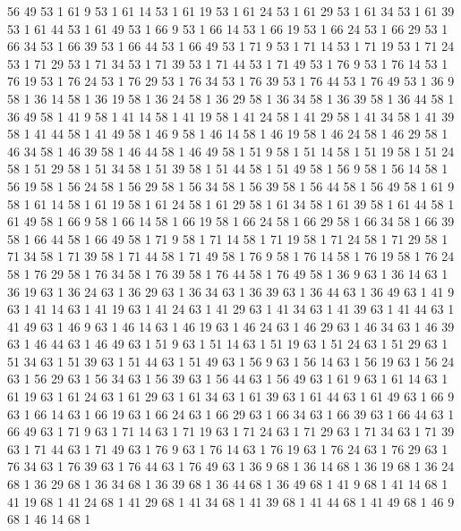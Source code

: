 	56	49	53	1
	61	9	53	1
	61	14	53	1
	61	19	53	1
	61	24	53	1
	61	29	53	1
	61	34	53	1
	61	39	53	1
	61	44	53	1
	61	49	53	1
	66	9	53	1
	66	14	53	1
	66	19	53	1
	66	24	53	1
	66	29	53	1
	66	34	53	1
	66	39	53	1
	66	44	53	1
	66	49	53	1
	71	9	53	1
	71	14	53	1
	71	19	53	1
	71	24	53	1
	71	29	53	1
	71	34	53	1
	71	39	53	1
	71	44	53	1
	71	49	53	1
	76	9	53	1
	76	14	53	1
	76	19	53	1
	76	24	53	1
	76	29	53	1
	76	34	53	1
	76	39	53	1
	76	44	53	1
	76	49	53	1
	36	9	58	1
	36	14	58	1
	36	19	58	1
	36	24	58	1
	36	29	58	1
	36	34	58	1
	36	39	58	1
	36	44	58	1
	36	49	58	1
	41	9	58	1
	41	14	58	1
	41	19	58	1
	41	24	58	1
	41	29	58	1
	41	34	58	1
	41	39	58	1
	41	44	58	1
	41	49	58	1
	46	9	58	1
	46	14	58	1
	46	19	58	1
	46	24	58	1
	46	29	58	1
	46	34	58	1
	46	39	58	1
	46	44	58	1
	46	49	58	1
	51	9	58	1
	51	14	58	1
	51	19	58	1
	51	24	58	1
	51	29	58	1
	51	34	58	1
	51	39	58	1
	51	44	58	1
	51	49	58	1
	56	9	58	1
	56	14	58	1
	56	19	58	1
	56	24	58	1
	56	29	58	1
	56	34	58	1
	56	39	58	1
	56	44	58	1
	56	49	58	1
	61	9	58	1
	61	14	58	1
	61	19	58	1
	61	24	58	1
	61	29	58	1
	61	34	58	1
	61	39	58	1
	61	44	58	1
	61	49	58	1
	66	9	58	1
	66	14	58	1
	66	19	58	1
	66	24	58	1
	66	29	58	1
	66	34	58	1
	66	39	58	1
	66	44	58	1
	66	49	58	1
	71	9	58	1
	71	14	58	1
	71	19	58	1
	71	24	58	1
	71	29	58	1
	71	34	58	1
	71	39	58	1
	71	44	58	1
	71	49	58	1
	76	9	58	1
	76	14	58	1
	76	19	58	1
	76	24	58	1
	76	29	58	1
	76	34	58	1
	76	39	58	1
	76	44	58	1
	76	49	58	1
	36	9	63	1
	36	14	63	1
	36	19	63	1
	36	24	63	1
	36	29	63	1
	36	34	63	1
	36	39	63	1
	36	44	63	1
	36	49	63	1
	41	9	63	1
	41	14	63	1
	41	19	63	1
	41	24	63	1
	41	29	63	1
	41	34	63	1
	41	39	63	1
	41	44	63	1
	41	49	63	1
	46	9	63	1
	46	14	63	1
	46	19	63	1
	46	24	63	1
	46	29	63	1
	46	34	63	1
	46	39	63	1
	46	44	63	1
	46	49	63	1
	51	9	63	1
	51	14	63	1
	51	19	63	1
	51	24	63	1
	51	29	63	1
	51	34	63	1
	51	39	63	1
	51	44	63	1
	51	49	63	1
	56	9	63	1
	56	14	63	1
	56	19	63	1
	56	24	63	1
	56	29	63	1
	56	34	63	1
	56	39	63	1
	56	44	63	1
	56	49	63	1
	61	9	63	1
	61	14	63	1
	61	19	63	1
	61	24	63	1
	61	29	63	1
	61	34	63	1
	61	39	63	1
	61	44	63	1
	61	49	63	1
	66	9	63	1
	66	14	63	1
	66	19	63	1
	66	24	63	1
	66	29	63	1
	66	34	63	1
	66	39	63	1
	66	44	63	1
	66	49	63	1
	71	9	63	1
	71	14	63	1
	71	19	63	1
	71	24	63	1
	71	29	63	1
	71	34	63	1
	71	39	63	1
	71	44	63	1
	71	49	63	1
	76	9	63	1
	76	14	63	1
	76	19	63	1
	76	24	63	1
	76	29	63	1
	76	34	63	1
	76	39	63	1
	76	44	63	1
	76	49	63	1
	36	9	68	1
	36	14	68	1
	36	19	68	1
	36	24	68	1
	36	29	68	1
	36	34	68	1
	36	39	68	1
	36	44	68	1
	36	49	68	1
	41	9	68	1
	41	14	68	1
	41	19	68	1
	41	24	68	1
	41	29	68	1
	41	34	68	1
	41	39	68	1
	41	44	68	1
	41	49	68	1
	46	9	68	1
	46	14	68	1
